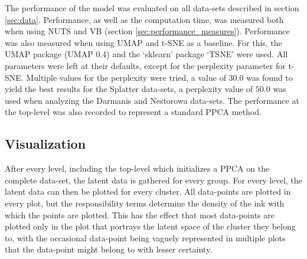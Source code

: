 The performance of the model was evaluated on all data-sets described in section \ref{sec:data}. Performance, as well as the computation time, was measured both when using NUTS and VB (section \ref{sec:performance_measures}). Performance was also measured when using UMAP \cite{mcinnes2018umap} and t-SNE \cite{maaten2008visualizing} as a baseline. For this, the UMAP package (UMAP 0.4) \cite{mcinnes2018umap} and the `sklearn' package `TSNE' were used. All parameters were left at their defaults, except for the perplexity parameter for t-SNE. Multiple values for the perplexity were tried, a value of $30.0$ was found to yield the best results for the Splatter data-sets, a perplexity value of $50.0$ was used when analyzing the Darmanis and Nestorowa data-sets. The performance at the top-level was also recorded to represent a standard PPCA method.

\subsection{Visualization}\label{sec:visualization}
After every level, including the top-level which initializes a PPCA on the complete data-set, the latent data is gathered for every group. For every level, the latent data can then be plotted for every cluster. All data-points are plotted in every plot, but the responsibility terms determine the density of the ink with which the points are plotted. This has the effect that most data-points are plotted only in the plot that portrays the latent space of the cluster they belong to, with the occasional data-point being vaguely represented in multiple plots that the data-point might belong to with lesser certainty.

